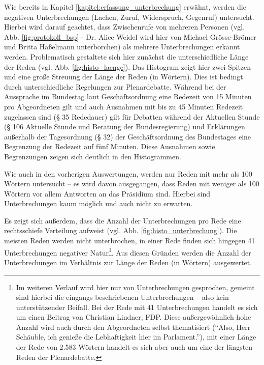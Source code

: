 \documentclass[12pt, 
    twoside=false, 
    bibliography=totoc, 
    numbers=endperiod, 
    headings=normal, 
    toc=chapterentrydotfill
    ]{scrbook}
\begin{document}
Wie bereits in Kapitel \ref{kapitel:erfassung_unterbrechung} erwähnt, werden die negativen Unterbrechungen (Lachen, Zuruf, Widerspruch, Gegenruf) untersucht. Hierbei wird darauf geachtet, dass Zwischenrufe von mehreren Personen (vgl. Abb. \ref{fig:protokoll_bsp} - Dr. Alice Weidel wird hier von Michael Grösse-Brömer und Britta Haßelmann unterborchen) als mehrere Unterbrechungen erkannt werden. Problematisch gestaltete sich hier zunächst die unterschiedliche Länge der Reden (vgl. Abb. \ref{fig:histo_laenge}). Das Histogram zeigt hier zwei Spitzen und eine große Streuung der Länge der Reden (in Wörtern).
Dies ist bedingt durch unterschiedliche Regelungen zur Plenardebatte. Während bei der Aussprache  im Bundestag laut Geschäftsordnung eine Redezeit von 15 Minuten pro Abgeordneten gilt und auch Ausnahmen mit bis zu 45 Minuten Redezeit zugelassen sind (§ 35 Rededauer) gilt für Debatten während der Aktuellen Stunde (§ 106 Aktuelle Stunde und Beratung der Bundesregierung) und Erklärungen außerhalb der Tagesordnung (§ 32) der Geschäftsordnung des Bundestages \parencite{bundestag_2019} eine Begrenzung der Redezeit auf fünf Minuten. Diese Ausnahmen sowie Begrenzungen zeigen sich deutlich in den Histogrammen.

Wie auch in den vorherigen Auswertungen, werden nur Reden mit mehr als 100 Wörtern untersucht -- es wird davon ausgegangen, dass Reden mit weniger als 100 Wörtern vor allem Antworten an das Präsidium sind. Hierbei sind Unterbrechungen kaum möglich und auch nicht zu erwarten.

Es zeigt sich außerdem, dass die Anzahl der Unterbrechungen pro Rede eine rechtsschiefe Verteilung aufweist (vgl. Abb. \ref{fig:histo_unterbrechung}). Die meisten Reden werden nicht unterbrochen, in einer Rede finden sich hingegen 41 Unterbrechungen negativer Natur\footnote{Im weiteren Verlauf wird hier nur von Unterbrechungen gesprochen, gemeint sind hierbei die eingangs beschriebenen Unterbrechungen -- also kein unterstützender Beifall. Bei der Rede mit 41 Unterbrechungen handelt es sich um einen Beitrag von Christian Lindner, FDP. Diese außergewöhnlich hohe Anzahl wird auch durch den Abgeordneten selbst thematisiert (\enquote{Also, Herr Schäuble, ich genieße die Lebhaftigkeit hier im Parlament.}), mit einer Länge der Rede von 2.583 Wörtern handelt es sich aber auch um eine der längsten Reden der Plenardebatte.}. Aus diesen Gründen werden die Anzahl der Unterbrechungen im Verhältnis zur Länge der Reden (in Wörtern) ausgewertet.
\end{document}
